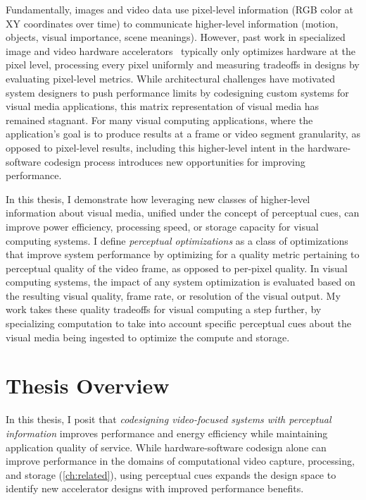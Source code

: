 Fundamentally, images and video data use pixel-level information (RGB color at XY coordinates over time) to communicate higher-level information (motion, objects, visual importance, scene meanings).
However, past work in specialized image and video hardware accelerators~\cite{hauswald2014hybrid, convolution_engine, adams2010frankencamera} typically only optimizes hardware at the pixel level, processing every pixel uniformly and measuring tradeoffs in designs by evaluating pixel-level metrics.
While architectural challenges have motivated system designers to push performance limits by codesigning custom systems for visual media applications, this matrix representation of visual media has remained stagnant.
For many visual computing applications, where the application's goal is to produce results at a frame or video segment granularity, as opposed to pixel-level results, including this higher-level intent in the hardware-software codesign process introduces new opportunities for improving performance.

In this thesis, I demonstrate how leveraging new classes of higher-level information about visual media, unified under the concept of perceptual cues, can improve power efficiency, processing speed, or storage capacity for visual computing systems.
I define \textit{perceptual optimizations} as a class of optimizations that improve system performance by optimizing for a quality metric pertaining to perceptual quality of the video frame, as opposed to per-pixel quality.
In visual computing systems, the impact of any system optimization is evaluated based on the resulting visual quality, frame rate, or resolution of the visual output.
My work takes these quality tradeoffs for visual computing a step further, by specializing computation to take into account specific perceptual cues about the visual media being ingested to optimize the compute and storage.

\section{Thesis Overview}
In this thesis, I posit that \emph{codesigning video-focused systems with perceptual information} improves performance and energy efficiency while maintaining application quality of service.
While hardware-software codesign alone can improve performance in the domains of computational video capture, processing, and storage (\ref{ch:related}), using perceptual cues expands the design space to identify new accelerator designs with improved performance benefits.

